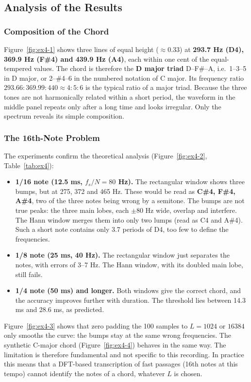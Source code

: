 \documentclass[12pt, a4paper]{article}
\begin{document}
\subsection{Analysis of the Results}

\subsubsection{Composition of the Chord}
Figure~\ref{fig:ex4-1} shows three lines of equal height ($\approx0.33$) at \textbf{293.7 Hz (D4), 369.9 Hz (F\#4) and 439.9 Hz (A4)}, each within one cent of the equal-tempered values. The chord is therefore the \textbf{D major triad} D--F\#--A, i.e.\ 1--3--5 in D major, or 2--\#4--6 in the numbered notation of C major. Its frequency ratio $293.66:369.99:440\approx4:5:6$ is the typical ratio of a major triad. Because the three tones are not harmonically related within a short period, the waveform in the middle panel repeats only after a long time and looks irregular. Only the spectrum reveals its simple composition.

\subsubsection{The 16th-Note Problem}
The experiments confirm the theoretical analysis (Figure~\ref{fig:ex4-2}, Table~\ref{tab:ex4}):
\begin{itemize}
    \item \textbf{1/16 note (12.5 ms, $f_s/N=80$ Hz).} The rectangular window shows three bumps, but at 275, 372 and 465 Hz. These would be read as \textbf{C\#4, F\#4, A\#4}, two of the three notes being wrong by a semitone. The bumps are not true peaks: the three main lobes, each $\pm80$ Hz wide, overlap and interfere. The Hann window merges them into only two lumps (read as C4 and A\#4). Such a short note contains only 3.7 periods of D4, too few to define the frequencies.
    \item \textbf{1/8 note (25 ms, 40 Hz).} The rectangular window just separates the notes, with errors of 3--7 Hz. The Hann window, with its doubled main lobe, still fails.
    \item \textbf{1/4 note (50 ms) and longer.} Both windows give the correct chord, and the accuracy improves further with duration. The threshold lies between 14.3 ms and 28.6 ms, as predicted.
\end{itemize}
Figure~\ref{fig:ex4-3} shows that zero padding the 100 samples to $L=1024$ or $16384$ only smooths the curve: the bumps stay at the same wrong frequencies. The synthetic C-major chord (Figure~\ref{fig:ex4-4}) behaves in the same way. The limitation is therefore fundamental and not specific to this recording. In practice this means that a DFT-based transcription of fast passages (16th notes at this tempo) cannot identify the notes of a chord, whatever $L$ is chosen.
\end{document}
